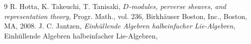 \documentclass[12pt, a4paper]{amsart}
\begin{document}
\begin{thebibliography}{9}
{\sc R. Hotta, K. Takeuchi, T. Tanisaki},
{\em $D$-modules, perverse sheaves, and representation theory},
Progr. Math., vol. 236, Birkhäuser Boston, Inc., Boston, MA, 2008.
{\sc J. C. Jantzen},
{\em Einhüllende Algebren halbeinfacher Lie-Algebren},
Einhüllende Algebren halbeinfacher Lie-Algebren,

\end{thebibliography}
\end{document}
